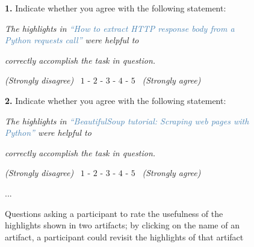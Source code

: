 \begin{figure}
\begin{mdframed}[backgroundcolor=gray!15] 
\begin{scriptsize}

\noindent \textbf{1.} Indicate whether you agree with the following statement:

\medskip

\quad \textit{The highlights in \textcolor{steelblue}{``How to extract HTTP response body from a Python requests call''} were helpful to} 

\quad \textit{correctly accomplish the task in question.}  \smallskip

\smallskip

\quad \quad \textit{(Strongly disagree)} ~$1$ - $2$ - $3$ - $4$ - $5$ ~\textit{(Strongly agree)} 


\bigskip


\noindent \textbf{2.} Indicate whether you agree with the following statement:

\medskip

\quad \textit{The highlights in \textcolor{steelblue}{``BeautifulSoup tutorial: Scraping web pages with Python''} were helpful to} 

\quad \textit{correctly accomplish the task in question.}  \smallskip

\smallskip

\quad \quad \textit{(Strongly disagree)} ~$1$ - $2$ - $3$ - $4$ - $5$ ~\textit{(Strongly agree)} 

\centering 

...

\end{scriptsize}
\end{mdframed}
\caption{Questions asking a participant to rate the usefulness of the highlights shown in two artifacts; by clicking on the name of an artifact, a participant could revisit the highlights of that artifact}
\label{fig:experiment-rating}
\end{figure}

    
